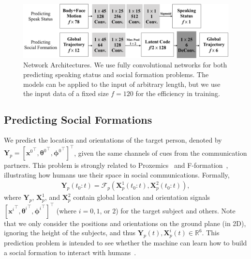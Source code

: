 

\begin{figure}[t]
	\includegraphics[width=\linewidth]{ssp_fig/ssp_imp_detail.pdf}
	\caption{Network Architectures. We use fully convolutional networks for both predicting speaking status and social formation problems. The models can be applied to the input of arbitrary length, but we use the input data of a fixed size $f=120$ for the efficiency in training.}
	\label{fig:ssp_imp_detail}
\end{figure}


\subsection{Predicting Social Formations}
We predict the location and orientations of the target person, denoted by $\mathbf{Y}_p = [{\mathbf{x}^0}^{\top}, {\boldsymbol{\theta}^{0}}^{\top}, {\boldsymbol{\phi}^{0}}^{\top} ]^{\top}$, given the same channels of cues from the communication partners. This problem is strongly related to Proxemics~\cite{Hall66} and F-formation~\cite{kendon90}, illustrating how humans use their space in social communications. Formally, 
\begin{gather}	
 \mathbf{Y}_p (t_0:t) = \mathcal{F}_p \left( \mathbf{X}_p^1(t_0:t), \mathbf{X}_p^2(t_0:t) \right),
 \label{eq:pred_formation}
\end{gather}
where $\mathbf{Y}_p$, $\mathbf{X}_p^1$, and $\mathbf{X}_p^2$ contain global location and orientation signals $[{\mathbf{x}^i}^{\top}, {\boldsymbol{\theta}^{i}}^{\top}, {\boldsymbol{\phi}^{i}}^{\top} ]^{\top}$ (where $i=0,1$, or $2$) for the target subject and others.
Note that we only consider the positions and orientations on the ground plane (in 2D), ignoring the height of the subjects, and thus $\mathbf{Y}_p(t), \mathbf{X}_p^i(t) \in \mathbb{R}^6$. This prediction problem is intended to see whether the machine can learn how to build a social formation to interact with humans~\cite{vazquez2017towards}.

